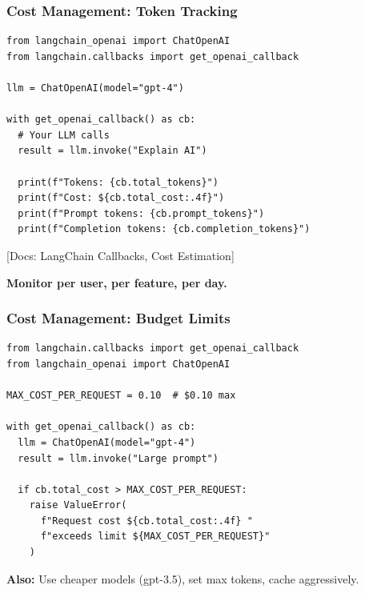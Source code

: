 \documentclass[aspectratio=169,11pt]{beamer}
\newcommand{\docref}[1]{{\scriptsize\color{docgray}[Docs: #1]}}
\begin{document}
\begin{frame}[fragile]
\frametitle{Cost Management: Token Tracking}

\begin{lstlisting}
from langchain_openai import ChatOpenAI
from langchain.callbacks import get_openai_callback

llm = ChatOpenAI(model="gpt-4")

with get_openai_callback() as cb:
  # Your LLM calls
  result = llm.invoke("Explain AI")

  print(f"Tokens: {cb.total_tokens}")
  print(f"Cost: ${cb.total_cost:.4f}")
  print(f"Prompt tokens: {cb.prompt_tokens}")
  print(f"Completion tokens: {cb.completion_tokens}")
\end{lstlisting}
\vspace{-0.15cm}

\docref{LangChain Callbacks, Cost Estimation}

\vspace{0.5em}

\small\textbf{Monitor per user, per feature, per day.}

\end{frame}

\begin{frame}[fragile]
\frametitle{Cost Management: Budget Limits}

\begin{lstlisting}
from langchain.callbacks import get_openai_callback
from langchain_openai import ChatOpenAI

MAX_COST_PER_REQUEST = 0.10  # $0.10 max

with get_openai_callback() as cb:
  llm = ChatOpenAI(model="gpt-4")
  result = llm.invoke("Large prompt")

  if cb.total_cost > MAX_COST_PER_REQUEST:
    raise ValueError(
      f"Request cost ${cb.total_cost:.4f} "
      f"exceeds limit ${MAX_COST_PER_REQUEST}"
    )
\end{lstlisting}

\small\textbf{Also:} Use cheaper models (gpt-3.5), set max tokens, cache aggressively.

\end{frame}
\end{document}
